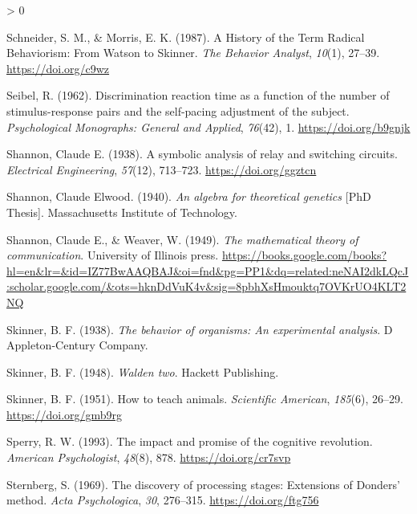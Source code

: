 \documentclass[
  oneside,
  12pt]{crumpbook}
\newlength{\cslhangindent}
\newenvironment{CSLReferences}[2] %
 {%
  \setlength{\parindent}{0pt}
  \ifodd #1 \everypar{\setlength{\hangindent}{\cslhangindent}}\ignorespaces\fi
  \ifnum #2 > 0
  \setlength{\parskip}{#2\baselineskip}
  \fi
 }%
 {}
\begin{document}
\begin{CSLReferences}{1}{0}
\leavevmode\hypertarget{ref-schneiderHistoryTermRadical1987}{}%
Schneider, S. M., \& Morris, E. K. (1987). A {History} of the {Term Radical Behaviorism}: {From Watson} to {Skinner}. \emph{The Behavior Analyst}, \emph{10}(1), 27--39. \url{https://doi.org/c9wz}

\leavevmode\hypertarget{ref-seibelDiscriminationReactionTime1962}{}%
Seibel, R. (1962). Discrimination reaction time as a function of the number of stimulus-response pairs and the self-pacing adjustment of the subject. \emph{Psychological Monographs: General and Applied}, \emph{76}(42), 1. \url{https://doi.org/b9gnjk}

\leavevmode\hypertarget{ref-shannonSymbolicAnalysisRelay1938}{}%
Shannon, Claude E. (1938). A symbolic analysis of relay and switching circuits. \emph{Electrical Engineering}, \emph{57}(12), 713--723. \url{https://doi.org/ggztcn}

\leavevmode\hypertarget{ref-shannonAlgebraTheoreticalGenetics1940}{}%
Shannon, Claude Elwood. (1940). \emph{An algebra for theoretical genetics} {[}PhD Thesis{]}. {Massachusetts Institute of Technology}.

\leavevmode\hypertarget{ref-shannonMathematicalTheoryCommunication1949}{}%
Shannon, Claude E., \& Weaver, W. (1949). \emph{The mathematical theory of communication}. {University of Illinois press}. \url{https://books.google.com/books?hl=en\&lr=\&id=IZ77BwAAQBAJ\&oi=fnd\&pg=PP1\&dq=related:neNAI2dkLQcJ:scholar.google.com/\&ots=hknDdVuK4v\&sig=8pbhXsHmouktq7OVKrUO4KLT2NQ}

\leavevmode\hypertarget{ref-skinnerBehaviorOrganismsExperimental1938}{}%
Skinner, B. F. (1938). \emph{The behavior of organisms: {An} experimental analysis}. {D Appleton-Century Company}.

\leavevmode\hypertarget{ref-skinnerWaldenTwo1948}{}%
Skinner, B. F. (1948). \emph{Walden two}. {Hackett Publishing}.

\leavevmode\hypertarget{ref-skinnerHowTeachAnimals1951}{}%
Skinner, B. F. (1951). How to teach animals. \emph{Scientific American}, \emph{185}(6), 26--29. \url{https://doi.org/gmb9rg}

\leavevmode\hypertarget{ref-sperryImpactPromiseCognitive1993}{}%
Sperry, R. W. (1993). The impact and promise of the cognitive revolution. \emph{American Psychologist}, \emph{48}(8), 878. \url{https://doi.org/cr7svp}

\leavevmode\hypertarget{ref-sternbergDiscoveryProcessingStages1969a}{}%
Sternberg, S. (1969). The discovery of processing stages: {Extensions} of {Donders}' method. \emph{Acta Psychologica}, \emph{30}, 276--315. \url{https://doi.org/ftg756}


\end{CSLReferences}
\end{document}
